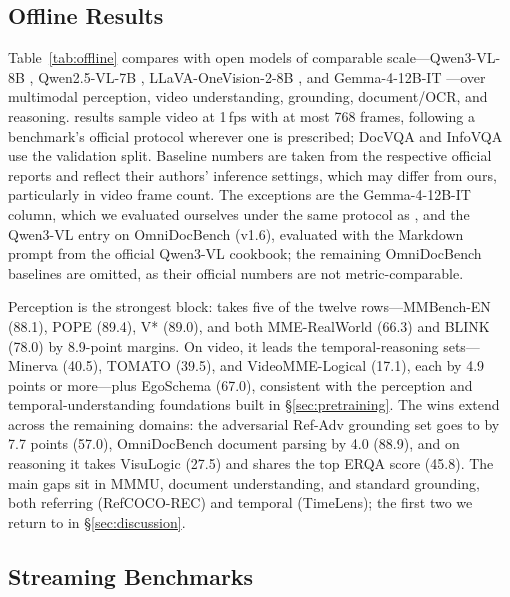 \subsection{Offline Results}\label{sec:eval-offline}

Table~\ref{tab:offline} compares \mossinstruct{} with open models of
comparable scale---Qwen3-VL-8B \citep{Bai2025qwen}, Qwen2.5-VL-7B
\citep{Bai2025qwenvl25}, LLaVA-OneVision-2-8B \citep{An2026llava}, and
Gemma-4-12B-IT \citep{Team2026gemma}---over multimodal perception, video
understanding, grounding, document/OCR, and reasoning.
\mossvl{} results sample video at 1\,fps with at most 768 frames,
following a benchmark's official protocol wherever one is prescribed;
DocVQA and InfoVQA use the validation split. Baseline numbers are
taken from the respective official reports and reflect their authors'
inference settings, which may differ from ours, particularly in video
frame count. The exceptions are the Gemma-4-12B-IT column, which we
evaluated ourselves under the same protocol as \mossvl{}, and the
Qwen3-VL entry on OmniDocBench (v1.6), evaluated with the Markdown
prompt from the official Qwen3-VL cookbook; the remaining OmniDocBench
baselines are omitted, as their official numbers are not
metric-comparable.

Perception is the strongest block: \mossinstruct{} takes five of the
twelve rows---MMBench-EN (88.1), POPE (89.4), V* (89.0), and both
MME-RealWorld (66.3) and BLINK (78.0) by 8.9-point margins. On video,
it leads the temporal-reasoning sets---Minerva (40.5),
TOMATO (39.5), and VideoMME-Logical (17.1), each by 4.9 points or
more---plus EgoSchema (67.0), consistent with the
perception and temporal-understanding foundations built in
\S\ref{sec:pretraining}. The wins extend across the remaining
domains: the adversarial Ref-Adv grounding set goes to \mossinstruct{}
by 7.7 points (57.0), OmniDocBench document parsing by 4.0 (88.9), and on
reasoning it takes VisuLogic (27.5) and shares the top ERQA score
(45.8). The main gaps sit in MMMU, document understanding, and
standard grounding, both referring (RefCOCO-REC) and temporal
(TimeLens); the first two we return to in \S\ref{sec:discussion}.

\subsection{Streaming Benchmarks}\label{sec:eval-streaming}

